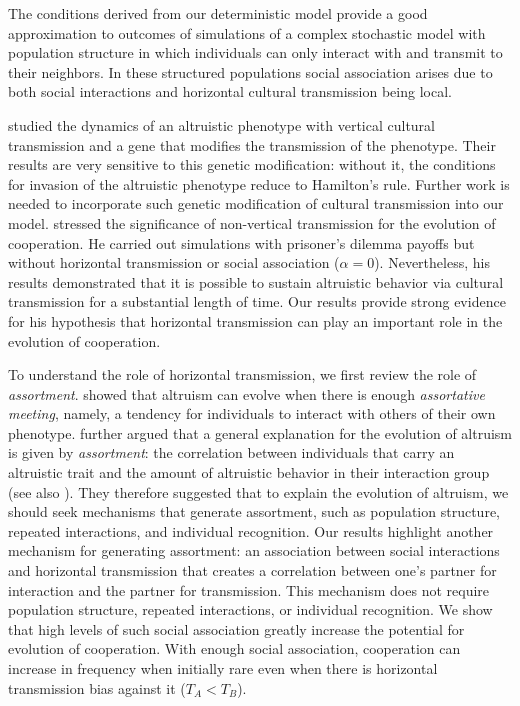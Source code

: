 \documentclass[12pt]{extarticle}
\begin{document}
The conditions derived from our deterministic model provide a good approximation to outcomes of simulations of a complex stochastic model with population structure in which individuals can only interact with and transmit to their neighbors.
In these structured populations social association arises due to both social interactions and horizontal cultural transmission being local.

\citet{feldman1985gene} studied the dynamics of an altruistic phenotype with vertical cultural transmission and a gene that modifies the transmission of the phenotype. Their results are very sensitive to this genetic modification: without it, the conditions for invasion of the altruistic phenotype reduce to Hamilton's rule.
Further work is needed to incorporate such genetic modification of cultural transmission into our model.
\citet{woodcock2006significance} stressed the significance of non-vertical transmission for the evolution of cooperation.
He carried out simulations with prisoner's dilemma payoffs but without horizontal transmission or social association ($\alpha=0$). Nevertheless, his results demonstrated that it is possible to sustain altruistic behavior via cultural transmission for a substantial length of time.
Our results provide strong evidence for his hypothesis that horizontal transmission can play an important role in the evolution of cooperation. 

To understand the role of horizontal transmission, we first review the role of \emph{assortment}.
\citet{Eshel1982} showed that altruism can evolve when there is enough \emph{assortative meeting}, namely, a tendency for individuals to interact with others of their own phenotype.
\citet{Fletcher2009assortment}  further argued that a general explanation for the evolution of altruism is given by \emph{assortment}: the correlation between individuals that carry an altruistic trait and the amount of altruistic behavior in their interaction group (see also \citet{Bijma2010assortment}).
They therefore suggested that to explain the evolution of altruism, we should seek mechanisms that generate  assortment, such as population structure, repeated interactions, and individual recognition.
Our results highlight another mechanism for generating assortment: an association between social interactions and horizontal transmission that creates a correlation between one's partner for interaction and the partner for transmission.
This mechanism does not require population structure, repeated interactions, or individual recognition.
We show that high levels of such social association greatly increase the potential for evolution of cooperation.
With enough social association, cooperation can increase in frequency when initially rare even when there is horizontal transmission bias against it ($T_A<T_B$).
\end{document}
